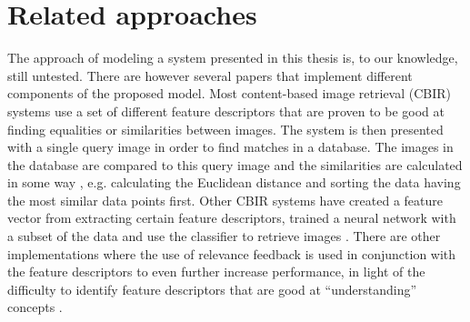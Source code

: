 \section{Related approaches}
\label{sec:method:rel_approaches}
The approach of modeling a system presented in this thesis is, to our knowledge, still untested.
There are however several papers that implement different components of the proposed model.
Most content-based image retrieval (CBIR) systems use a set of different feature descriptors that are proven to be good at finding equalities or similarities between images. The system is then presented with a single query image in order to find matches in a database. The images in the database are compared to this query image and the similarities are calculated in some way \cite{wang2001simplicity}\cite{subrahmanyam2013modified}\cite{nagaraja2015low}, e.g. calculating the Euclidean distance and sorting the data having the most similar  data points first.
Other CBIR systems have created a feature vector from extracting certain feature descriptors, trained a neural network with a subset of the data and use the classifier to retrieve images \cite{elalami2014new}. 
There are other implementations where the use of relevance feedback is used in conjunction with the feature descriptors to even further increase performance, in light of the difficulty to identify feature descriptors that are good at ``understanding'' concepts \cite{wang2015new}. 
